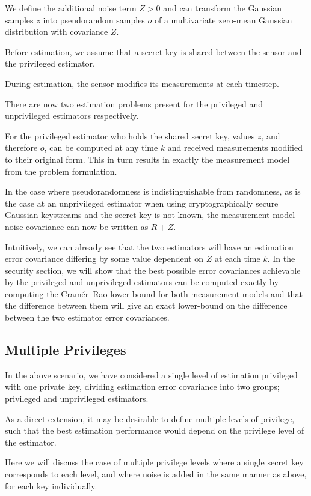 \documentclass[conference]{IEEEtran}
\theoremstyle{definition}
\theoremstyle{definition}
\theoremstyle{remark}
\begin{document}
We define the additional noise term $Z>0$ and can transform the Gaussian samples $z$ into pseudorandom samples $o$ of a multivariate zero-mean Gaussian distribution with covariance $Z$.

Before estimation, we assume that a secret key is shared between the sensor and the privileged estimator.

During estimation, the sensor modifies its measurements at each timestep.

There are now two estimation problems present for the privileged and unprivileged estimators respectively.

For the privileged estimator who holds the shared secret key, values $z$, and therefore $o$, can be computed at any time $k$ and received measurements modified to their original form. This in turn results in exactly the measurement model from the problem formulation.

In the case where pseudorandomness is indistinguishable from randomness, as is the case at an unprivileged estimator when using cryptographically secure Gaussian keystreams and the secret key is not known, the measurement model noise covariance can now be written as $R+Z$.

Intuitively, we can already see that the two estimators will have an estimation error covariance differing by some value dependent on $Z$ at each time $k$. In the security section, we will show that the best possible error covariances achievable by the privileged and unprivileged estimators can be computed exactly by computing the Cramér–Rao lower-bound for both measurement models and that the difference between them will give an exact lower-bound on the difference between the two estimator error covariances.

\subsection{Multiple Privileges}
In the above scenario, we have considered a single level of estimation privileged with one private key, dividing estimation error covariance into two groups; privileged and unprivileged estimators.

As a direct extension, it may be desirable to define multiple levels of privilege, such that the best estimation performance would depend on the privilege level of the estimator.

Here we will discuss the case of multiple privilege levels where a single secret key corresponds to each level, and where noise is added in the same manner as above, for each key individually.
\end{document}
